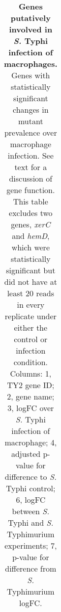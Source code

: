 %
\begin{table}
   \centering
   \noindent
    \caption[Genes putatively involved in {\it S.} Typhi infection of macrophages]{\textbf{Genes putatively involved in {\it S.} Typhi infection of macrophages.} Genes with statistically significant changes in mutant prevalence over macrophage infection. See text for a discussion of gene function. This table excludes two genes, {\it xerC} and {\it hemD}, which were statistically significant but did not have at least 20 reads in every replicate under either the control or infection condition.  Columns: 1, TY2 gene ID; 2, gene name; 3, logFC over {\it S.} Typhi infection of macrophage; 4, adjusted p-value for difference to {\it S.} Typhi control; 6, logFC between {\it S.} Typhi and {\it S.} Typhimurium experiments; 7, p-value for difference from {\it S.} Typhimurium logFC. }
    \begin{tabular}{ l
    				l
				r
    				c
				r
				c
				}
   

\end{tabular}
\end{table}

